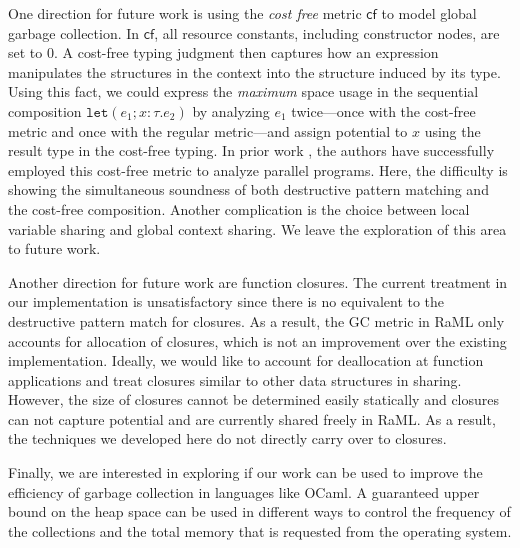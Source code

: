 \documentclass{easychair}
\newcommand{\ms}[1]{\ensuremath{\mathsf{#1}}}
\newcommand{\irl}[1]{\mathtt{#1}}
\newcounter{rule}
\newcommand{\inferr}[2]{\inferrule{#2}{#1}}
\theoremstyle{definition}
\begin{document}
One direction for future work is using the \emph{cost free} metric $\ms{cf}$ to model global garbage 
collection. In $\ms{cf}$, all resource constants, including constructor nodes, are set to 0.
A cost-free typing judgment then captures how an expression 
manipulates the structures in the context into
the structure induced by its type. Using this fact, we could express the \emph{maximum}
space usage in the sequential
composition $\irl{let}(e_1; x : \tau.e_2)$ by analyzing $e_1$ twice---once with the cost-free metric 
and once with the regular metric---and assign potential to $x$ using the result type in the cost-free typing.
In prior work \cite{Hoffmann:2015:ASC:2769448.2769449}, the authors have successfully employed this 
cost-free metric to analyze parallel programs. Here, the difficulty is showing
the simultaneous soundness of both destructive pattern matching and the cost-free composition. 
Another complication is the choice between local variable sharing and global context sharing.
We leave the exploration of this area to future work.

Another direction for future work are function closures. The current
treatment in our implementation is unsatisfactory since there is no
equivalent to the destructive pattern match for closures.  As a
result, the GC metric in RaML only accounts for allocation of
closures, which is not an improvement over the existing
implementation.  Ideally, we would like to account for deallocation at
function applications and treat closures similar to other data
structures in sharing. However, the size of closures cannot be
determined easily statically and closures can not capture
potential and are currently shared freely in RaML.  As a result, the techniques
we developed here do not directly carry over to closures.

Finally, we are interested in exploring if our work can be used to
improve the efficiency of garbage collection in languages like
OCaml. A guaranteed upper bound on the heap space can be used in
different ways to control the frequency of the collections and the
total memory that is requested from the operating system.

\end{document}

